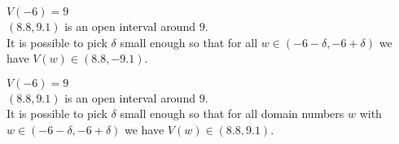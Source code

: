 \documentclass{ximera}
\begin{document}
\begin{exercise}
\begin{question}



$V(-6) = 9$ \\


$(8.8, 9.1)$ is an open interval around $9$. \\


It is possible to pick $\delta$ small enough so that for all $w \in (-6 - \delta, -6 + \delta)$ we have $V(w) \in (8.8, -9.1)$.


\begin{multipleChoice}
\end{multipleChoice}




\end{question}











\begin{question}



$V(-6) = 9$ \\


$(8.8, 9.1)$ is an open interval around $9$. \\


It is possible to pick $\delta$ small enough so that for all domain numbers $w$ with $w \in (-6 - \delta, -6 + \delta)$ we have $V(w) \in (8.8, 9.1)$.


\begin{multipleChoice}
\end{multipleChoice}




\end{question}








\end{exercise}
\end{document}
